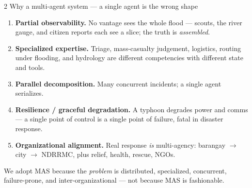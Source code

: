 \documentclass[aspectratio=169,11pt]{beamer}
\begin{document}
\begin{frame}{2 \;\; Why a multi-agent system --- a single agent is the wrong shape}
  \small
  \begin{enumerate}
    \item \textbf{Partial observability.} No vantage sees the whole flood --- scouts, the river
      gauge, and citizen reports each see a slice; the truth is \emph{assembled}.
    \item \textbf{Specialized expertise.} Triage, mass-casualty judgement, logistics, routing
      under flooding, and hydrology are different competencies with different state and tools.
    \item \textbf{Parallel decomposition.} Many concurrent incidents; a single agent serializes.
    \item \textbf{Resilience / graceful degradation.} A typhoon degrades power and comms ---
      a single point of control is a single point of failure, fatal in disaster response.
    \item \textbf{Organizational alignment.} Real response \emph{is} multi-agency:
      barangay $\rightarrow$ city $\rightarrow$ NDRRMC, plus relief, health, rescue, NGOs.
  \end{enumerate}
  \vspace{0.3em}
  \footnotesize We adopt MAS because the \emph{problem} is distributed, specialized, concurrent,
  failure-prone, and inter-organizational --- not because MAS is fashionable.
\end{frame}
\end{document}
